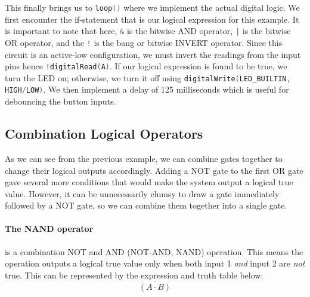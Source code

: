         

        This finally brings us to \lstinline[language=C++]{loop()} where we implement the actual digital logic.
        We first encounter the if-statement that is our logical expression for this example.
        It is important to note that here, \lstinline[language=C++]{&} is the bitwise AND operator, \lstinline[language=C++]{|} is the bitwise OR operator, and the \lstinline[language=C++]{!} is the bang or bitwise INVERT operator.
        Since this circuit is an active-low configuration, we must invert the readings from the input pins hence \lstinline[language=C++]{!digitalRead(A)}.
        If our logical expression is found to be true, we turn the LED on; otherwise, we turn it off using \lstinline[language=C++]{digitalWrite(LED_BUILTIN, HIGH/LOW)}.
        We then implement a delay of 125 milliseconds which is useful for debouncing the button inputs.

        


    \subsection{Combination Logical Operators}
    As we can see from the previous example, we can combine gates together to change their logical outputs accordingly.
    Adding a NOT gate to the first OR gate gave several more conditions that would make the system output a logical true value.
    However, it can be unnecessarily clumsy to draw a gate immediately followed by a NOT gate, so we can combine them together into a single gate.

    \paragraph*{The NAND operator} is a combination NOT and AND (NOT-AND, NAND) operation. 
    This means the operation outputs a logical true value only when both input 1 \textit{and} input 2 are \textit{not} true.
    This can be represented by the expression and truth table below:
    \begin{equation*}
        \overline{(A \cdot B)}
    \end{equation*}

